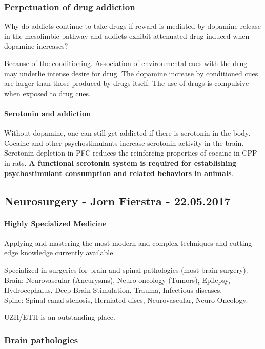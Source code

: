 \documentclass[12pt,article,oneside,a4paper]{memoir}
\begin{document}
\subsubsection{Perpetuation of drug addiction}
Why do addicts continue to take drugs if reward is mediated by dopamine release
in the mesolimbic pathway and addicts exhibit attenuated drug‐induced when
dopamine increases?

Because of the conditioning. Association of environmental cues with the drug may
underlie intense desire for drug. The dopamine increase by conditioned cues are
larger than those produced by drugs itself. The use of drugs is compulsive when
exposed to drug cues.

\paragraph{Serotonin and addiction}
Without dopamine, one can still get addicted if there is serotonin in the body.
Cocaine and other psychostimulants increase serotonin activity in the brain.
Serotonin depletion in PFC reduces the reinforcing properties of cocaine in CPP
in rats. \textbf{A functional serotonin system is required for establishing
psychostimulant consumption and related behaviors in animals}.

\newpage
\subsection{Neurosurgery - Jorn Fierstra - 22.05.2017}
\paragraph{Highly Specialized Medicine} Applying and mastering the most modern and complex techniques and cutting edge knowledge currently available.

Specialized in surgeries for brain and spinal pathologies (most brain surgery).
Brain: Neurovascular (Aneurysms), Neuro-oncology (Tumors), Epilepsy, Hydrocephalus, Deep Brain Stimulation, Trauma, Infectious diseases. \\
Spine: Spinal canal stenosis, Herniated discs, Neurovascular, Neuro-Oncology.

UZH/ETH is an outstanding place.

\subsubsection{Brain pathologies}
\end{document}

